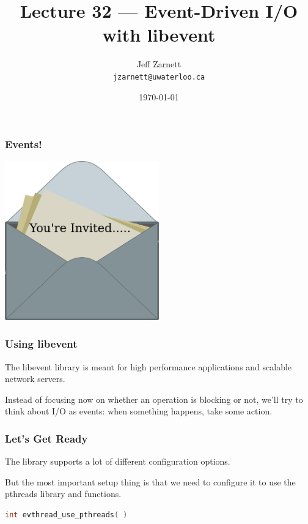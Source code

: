 

\title{Lecture 32 --- Event-Driven I/O with libevent }

\author{Jeff Zarnett \\ \small \texttt{jzarnett@uwaterloo.ca}}
\date{\today}




\begin{frame}
	\titlepage

\end{frame}



\begin{frame}
	\frametitle{Events!}

	\begin{center}
		\includegraphics[width=0.5\textwidth]{images/invitation}
	\end{center}


\end{frame}


\begin{frame}
	\frametitle{Using libevent}

	The libevent library is meant for high performance applications and scalable network servers.

	Instead of focusing now on whether an operation is blocking or not, we'll try to think about I/O as events: when something happens, take some action.

\end{frame}


\begin{frame}[fragile]
	\frametitle{Let's Get Ready}
	The library supports a lot of different configuration options.

	But the most important setup thing is that we need to configure it to use the pthreads library and functions.

	\begin{lstlisting}[language=C]
int evthread_use_pthreads( )
\end{lstlisting}

\end{frame}


